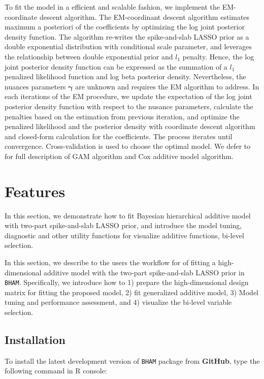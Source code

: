\documentclass[
]{jss}
\begin{document}
To fit the model in a efficient and scalable fashion, we implement the
EM-coordinate descent algorithm. The EM-coordinant descent algorithm
estimates maximum a posteriori of the coefficients by optimizing the log
joint posterior density function. The algorithm re-writes the
spike-and-slab LASSO prior as a double exponential distribution with
conditional scale parameter, and leverages the relationship between
double exponential prior and \(l_1\) penalty. Hence, the log joint
posterior density function can be expressed as the summation of a
\(l_1\) penalized likelihood function and log beta posterior density.
Nevertheless, the nuances parameters \(\boldsymbol{\gamma}\) are unknown
and requires the EM algorithm to address. In each iterations of the EM
procedure, we update the expectation of the log joint posterior density
function with respect to the nusance parameters, calculate the penalties
based on the estimation from previous iteration, and optimize the
penalized likelihood and the posterior density with coordinate descent
algorithm and closed-form calculation for the coefficients. The process
iterates until convergence. Cross-validation is used to choose the
optimal model. We defer \cite{guo2022_GAM, guo2022_Cox}to for full
description of GAM algorithm and Cox additive model algorithm.

\section{Features}

In this section, we demonstrate how to fit Bayesian hierarchical
additive model with two-part spike-and-slab LASSO prior, and introduce
the model tuning, diagnostic and other utility functions for visualize
additive functions, bi-level selection.

In this section, we describe to the users the workflow for of fitting a
high-dimensional additive model with the two-part spike-and-slab LASSO
prior in \texttt{BHAM}. Specifically, we introduce how to 1) prepare the
high-dimensional design matrix for fitting the proposed model, 2) fit
generalized additive model, 3) Model tuning and performance assessment,
and 4) visualize the bi-level variable selection.

\subsection{Installation}

To install the latest development version of \texttt{BHAM} package from
\textbf{GitHub}, type the following command in R console:
\end{document}
